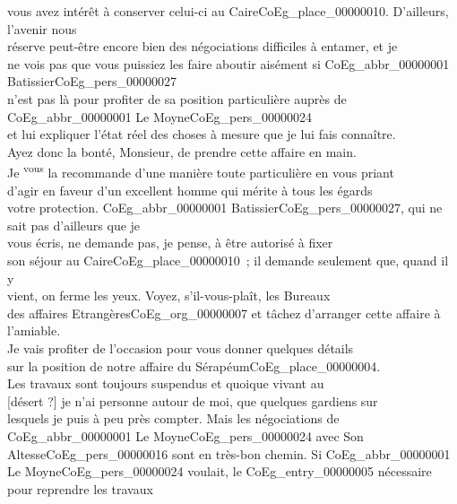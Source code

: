 \documentclass{book}
\begin{document}
vous avez intérêt à conserver celui-ci au Caire\gls{CoEg_place_00000010}. D’ailleurs, l’avenir nous\\
réserve peut-être encore bien des négociations difficiles à entamer, et je\\
ne vois pas que vous puissiez les faire aboutir aisément si \gls{CoEg_abbr_00000001} Batissier\gls{CoEg_pers_00000027}\\
n’est pas là pour profiter de sa position particulière auprès de \gls{CoEg_abbr_00000001} Le Moyne\gls{CoEg_pers_00000024}\\
et lui expliquer l’état réel des choses à mesure que je lui fais connaître.\\
\indent Ayez donc la bonté, Monsieur, de prendre cette affaire en main.\\
Je \textsuperscript{vous} la recommande d’une manière toute particulière en vous priant\\
d’agir en faveur d’un excellent homme qui mérite à tous les égards\\
votre protection. \gls{CoEg_abbr_00000001} Batissier\gls{CoEg_pers_00000027}, qui ne sait pas d’ailleurs que je\\
vous écris, ne demande pas, je pense, à être autorisé à fixer\\
son séjour au Caire\gls{CoEg_place_00000010}~; il demande seulement que, quand il y\\
vient, on ferme les yeux. Voyez, s’il-vous-plaît, les Bureaux\\
des affaires Etrangères\gls{CoEg_org_00000007} et tâchez d’arranger cette affaire à\\
l’amiable.\\
\indent Je vais profiter de l’occasion pour vous donner quelques détails\\
sur la position de notre affaire du Sérapéum\gls{CoEg_place_00000004}.\\
\indent Les travaux sont toujours suspendus et quoique vivant au\\
{[désert ?]} je n’ai personne autour de moi, que quelques gardiens sur\\
lesquels je puis à peu près compter. Mais les négociations de\\
\gls{CoEg_abbr_00000001} Le Moyne\gls{CoEg_pers_00000024} avec Son Altesse\gls{CoEg_pers_00000016} sont en très-bon chemin. Si \gls{CoEg_abbr_00000001}\\
Le Moyne\gls{CoEg_pers_00000024} voulait, le \gls{CoEg_entry_00000005} nécessaire pour reprendre les travaux\\
\end{document}
